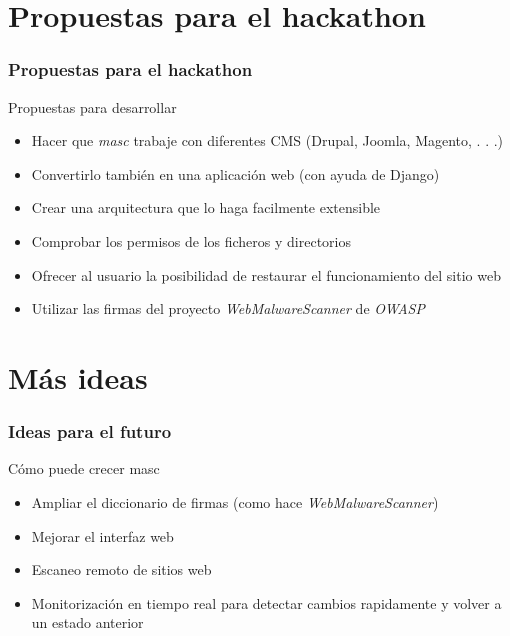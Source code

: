 \documentclass[xcolor={dvipsnames}]{beamer}
\begin{document}
\section{Propuestas para el hackathon}

\begin{frame}\frametitle{Propuestas para el hackathon}
    \begin{block}{Propuestas para desarrollar}
    \begin{itemize}
        \item Hacer que \emph{masc} trabaje con diferentes CMS (Drupal, Joomla, Magento, . . .)
        \item Convertirlo también en una aplicación web (con ayuda de Django)
        \item Crear una arquitectura que lo haga facilmente extensible
        \item Comprobar los permisos de los ficheros y directorios
        \item Ofrecer al usuario la posibilidad de restaurar el funcionamiento del sitio web
        \item Utilizar las firmas del proyecto \emph{WebMalwareScanner} de \emph{OWASP}
    \end{itemize}
    \end{block}
\end{frame}

\section{Más ideas}

\begin{frame}\frametitle{Ideas para el futuro}
    \begin{block}{Cómo puede crecer masc}
    \begin{itemize}
        \item Ampliar el diccionario de firmas (como hace \emph{WebMalwareScanner})
        \item Mejorar el interfaz web
        \item Escaneo remoto de sitios web
        \item Monitorización en tiempo real para detectar cambios rapidamente y volver a un estado anterior
    \end{itemize}
    \end{block}
\end{frame}
\end{document}
